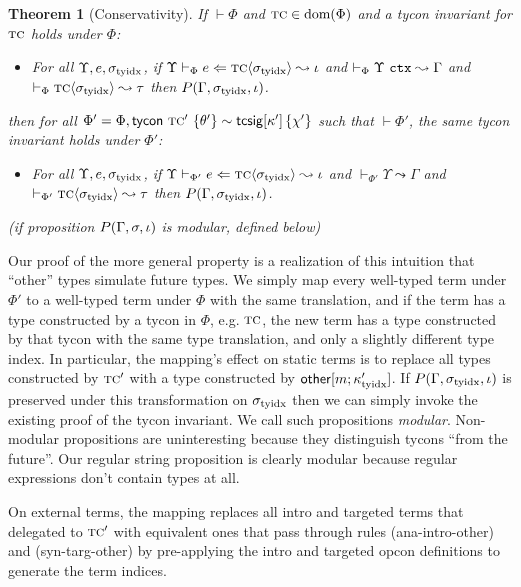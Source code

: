 \documentclass[pldi]{sigplanconf-pldi15}
\newtheorem{theorem}{Theorem}
\newenvironment{proof-sketch}{\noindent{\emph{Proof Sketch.}}}{\qed}
\begin{document}
\begin{theorem}[Conservativity]\label{thm:conservativity} If $\vdash \Phi$ and $\textsc{tc} \in \text{dom}(\Phi)$ and a tycon invariant for $\textsc{tc}$ holds under $\Phi$: \begin{itemize}
\item For all $\Upsilon, e, \sigma_\text{tyidx}$, if $\Upsilon \vdash_{\Phi} e \Leftarrow {\textsc{tc}}\langle\sigma_\text{tyidx}\rangle \leadsto \iota$ and $\vdash_{\Phi} \Upsilon~\mathtt{ctx} \leadsto \Gamma$ and $\vdash_\Phi {{\textsc{tc}}\langle\sigma_\text{tyidx}\rangle} \leadsto \tau$  then $P(\Gamma, \sigma_\text{tyidx}, \iota)$.
\end{itemize} then for all $\Phi' = \Phi, {\sf tycon}~\textsc{tc}' ~\{\theta'\} \sim {\sf tcsig}[\kappa']\,\{\chi'\}$ such that $\vdash \Phi'$, the same tycon invariant holds under $\Phi'$: \begin{itemize}
\item For all $\Upsilon, e, \sigma_\text{tyidx}$, if $\Upsilon \vdash_{\Phi'} e \Leftarrow {\textsc{tc}}\langle\sigma_\text{tyidx}\rangle \leadsto \iota$ and $\vdash_{\Phi'} \Upsilon \leadsto \Gamma$ and $\vdash_{\Phi'}{{\textsc{tc}}\langle\sigma_\text{tyidx}\rangle}\leadsto{\tau}$ then $P(\Gamma, \sigma_\text{tyidx}, \iota)$.
\end{itemize}
(if proposition $P(\Gamma, \sigma, \iota)$ is \emph{modular}, defined below)
\end{theorem}
\begin{proof-sketch}
Our proof of the more general property is a realization of this intuition that ``other'' types simulate future types. We simply map every well-typed term under $\Phi'$ to a well-typed term under $\Phi$ with the same translation, and if the term has a type constructed by a tycon in $\Phi$, e.g. $\textsc{tc}$, the new term has a type constructed by that tycon with the same type translation, and only a slightly different type index. In particular, the mapping's effect on static terms is to replace all types constructed by $\textsc{tc}'$ with a type constructed by ${\sf other}[m;\kappa_\text{tyidx}']$. If $P(\Gamma, \sigma_\text{tyidx}, \iota)$ is preserved under this transformation on $\sigma_\text{tyidx}$ then we can simply invoke the existing proof of the tycon invariant. We call such propositions \emph{modular}. Non-modular propositions are uninteresting because they distinguish tycons ``from the future''. Our regular string proposition is clearly modular because regular expressions don't contain types at all.

On external terms, the mapping replaces all intro and targeted terms that delegated to $\textsc{tc}'$ with equivalent ones that pass through rules (ana-intro-other) and (syn-targ-other) by pre-applying the intro and targeted opcon definitions to generate the term indices.\end{proof-sketch}
\end{document}
